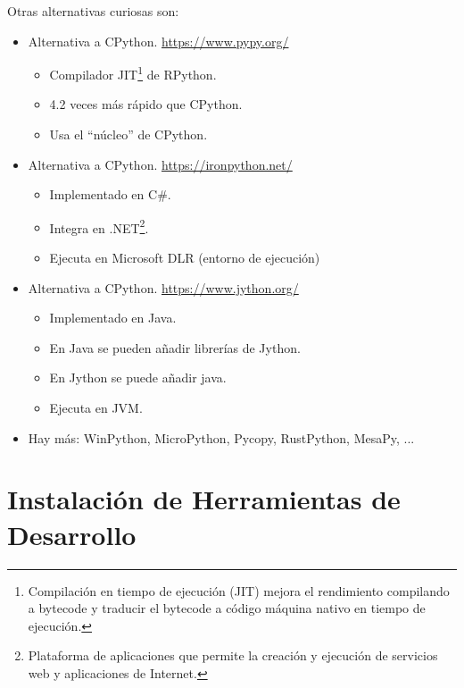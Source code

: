 Otras alternativas curiosas son:
\begin{itemize}
\item {} Alternativa a CPython. \url{https://www.pypy.org/}
	\begin{itemize}
	\item  Compilador JIT\footnote{Compilación en tiempo de ejecución (JIT) mejora el rendimiento compilando a bytecode y traducir el bytecode a código máquina nativo en tiempo de ejecución. } de RPython.
	\item 4.2 veces más rápido que CPython.
	\item Usa el ``núcleo'' de CPython.
	\end{itemize}
	
\item {} Alternativa a CPython. \url{https://ironpython.net/}
	\begin{itemize}
	\item Implementado en C\#.
	\item Integra  en .NET\footnote{Plataforma de aplicaciones que permite la creación y ejecución de servicios web y aplicaciones de Internet.}.
	\item Ejecuta  en Microsoft DLR (entorno de ejecución)
	\end{itemize}

\item {} Alternativa a CPython. \url{https://www.jython.org/}
	\begin{itemize}
	\item Implementado en Java.
	\item En Java se pueden añadir librerías de Jython.
	\item En Jython se puede añadir java.
	\item Ejecuta  en JVM.
	\end{itemize}

\item Hay más: WinPython, MicroPython, Pycopy, RustPython, MesaPy, ...
\end{itemize}




\section{Instalación de Herramientas de Desarrollo}


